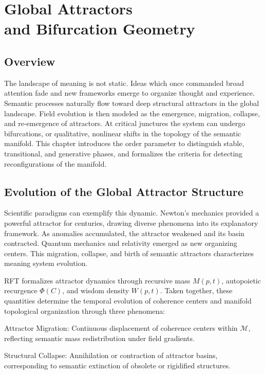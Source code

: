 \chapter{Global Attractors \\ and Bifurcation Geometry}

\section{Overview}

The landscape of meaning is not static. Ideas which once commanded broad attention fade and new frameworks emerge to organize thought and experience. Semantic processes naturally flow toward deep structural attractors in the global landscape. Field evolution is then modeled as the emergence, migration, collapse, and re-emergence of attractors. At critical junctures the system can undergo bifurcations, or qualitative, nonlinear shifts \autocite{Poincare1892, Thom1975} in the topology of the semantic manifold. This chapter introduces the order parameter to distinguish stable, transitional, and generative phases, and formalizes the criteria for detecting reconfigurations of the manifold.

\section{Evolution of the Global Attractor Structure}

Scientific paradigms can exemplify this dynamic. Newton's mechanics provided a powerful attractor for centuries, drawing diverse phenomena into its explanatory framework. As anomalies accumulated, the attractor weakened and its basin contracted. Quantum mechanics and relativity emerged as new organizing centers. This migration, collapse, and birth of semantic attractors characterizes meaning system evolution.

RFT formalizes attractor dynamics through recursive mass \(M(p,t)\), autopoietic recurgence \(\Phi(C)\), and wisdom density \(W(p,t)\). Taken together, these quantities determine the temporal evolution of coherence centers and manifold topological organization through three phenomena:

Attractor Migration: Continuous displacement of coherence centers within \(\mathcal{M}\), reflecting semantic mass redistribution under field gradients.

Structural Collapse: Annihilation or contraction of attractor basins, corresponding to semantic extinction of obsolete or rigidified structures.

